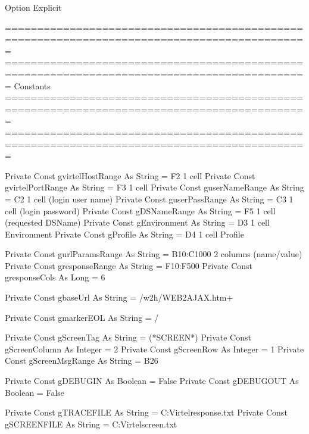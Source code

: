 \documentclass[letterpaper,10pt,english]{sphinxmanual}
\begin{document}
\begin{sphinxVerbatim}[commandchars=\\\{\}]
Option Explicit

\PYGZsq{}=============================================================================================
\PYGZsq{}=============================================================================================\PYGZsq{}
\PYGZsq{}   Constants
\PYGZsq{}
\PYGZsq{}=============================================================================================
\PYGZsq{}=============================================================================================

Private Const g\PYGZus{}virtelHostRange As String = \PYGZdq{}F2\PYGZdq{}            \PYGZsq{} 1 cell
Private Const g\PYGZus{}virtelPortRange As String = \PYGZdq{}F3\PYGZdq{}            \PYGZsq{} 1 cell
Private Const g\PYGZus{}userNameRange As String = \PYGZdq{}C2\PYGZdq{}              \PYGZsq{} 1 cell (login user name)
Private Const g\PYGZus{}userPassRange As String = \PYGZdq{}C3\PYGZdq{}              \PYGZsq{} 1 cell (login password)
Private Const g\PYGZus{}DSNameRange As String = \PYGZdq{}F5\PYGZdq{}                \PYGZsq{} 1 cell (requested DSName)
Private Const g\PYGZus{}Environment As String = \PYGZdq{}D3\PYGZdq{}                \PYGZsq{} 1 cell Environment
Private Const g\PYGZus{}Profile As String = \PYGZdq{}D4\PYGZdq{}                    \PYGZsq{} 1 cell Profile

Private Const g\PYGZus{}urlParamsRange As String = \PYGZdq{}B10:C1000\PYGZdq{}      \PYGZsq{} 2 columns (name/value)
Private Const g\PYGZus{}responseRange As String = \PYGZdq{}F10:F500\PYGZdq{}
Private Const g\PYGZus{}responseCols As Long = 6

Private Const g\PYGZus{}baseUrl As String = \PYGZdq{}/w2h/WEB2AJAX.htm+\PYGZdq{}

Private Const g\PYGZus{}markerEOL As String = \PYGZdq{}/\PYGZsh{}\PYGZdq{}

Private Const g\PYGZus{}ScreenTag As String = \PYGZdq{}(*SCREEN*)\PYGZdq{}
Private Const g\PYGZus{}ScreenColumn As Integer = 2
Private Const g\PYGZus{}ScreenRow As Integer = 1
Private Const g\PYGZus{}ScreenMsgRange As String = \PYGZdq{}B26\PYGZdq{}

Private Const g\PYGZus{}DEBUG\PYGZus{}IN As Boolean = False
Private Const g\PYGZus{}DEBUG\PYGZus{}OUT As Boolean = False

Private Const g\PYGZus{}TRACE\PYGZus{}FILE As String = \PYGZdq{}C:\PYGZbs{}Virtel\PYGZbs{}response.txt\PYGZdq{}
Private Const g\PYGZus{}SCREEN\PYGZus{}FILE As String = \PYGZdq{}C:\PYGZbs{}Virtel\PYGZbs{}screen.txt\PYGZdq{}


\end{sphinxVerbatim}
\end{document}
